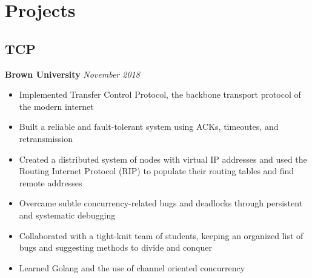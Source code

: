 \documentclass[11pt]{article}
\begin{document}

\section{Projects}

\subsection{TCP}
\textbf{Brown University} \hfill \textit{November 2018}
\begin{itemize}
	\item Implemented Transfer Control Protocol, the backbone transport protocol of the modern internet 
	\item Built a reliable and fault-tolerant system using ACKs, timeoutes, and retransmission
	\item Created a distributed system of nodes with virtual IP addresses and used the Routing Internet Protocol (RIP) to populate their routing tables and find remote addresses
	\item Overcame subtle concurrency-related bugs and deadlocks through persistent and systematic debugging 
	\item Collaborated with a tight-knit team of students, keeping an organized list of bugs and suggesting methods to divide and conquer
	\item Learned Golang and the use of channel oriented concurrency
\end{itemize}
\end{document}
